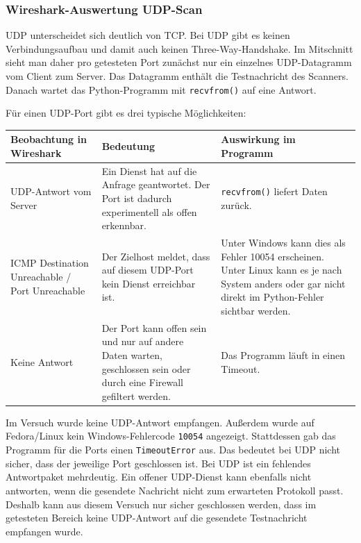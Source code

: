 \documentclass{kdiartcl}
\begin{document}
\subsubsection{Wireshark-Auswertung UDP-Scan}

UDP unterscheidet sich deutlich von TCP. Bei UDP gibt es keinen Verbindungsaufbau und damit auch keinen Three-Way-Handshake. Im Mitschnitt sieht man daher pro getesteten Port zunächst nur ein einzelnes UDP-Datagramm vom Client zum Server. Das Datagramm enthält die Testnachricht des Scanners. Danach wartet das Python-Programm mit \texttt{recvfrom()} auf eine Antwort.

Für einen UDP-Port gibt es drei typische Möglichkeiten:

\begin{center}
\small
\begin{tabularx}{\textwidth}{|l|Y|Y|}
\hline
\textbf{Beobachtung in Wireshark} & \textbf{Bedeutung} & \textbf{Auswirkung im Programm} \\
\hline
UDP-Antwort vom Server & Ein Dienst hat auf die Anfrage geantwortet. Der Port ist dadurch experimentell als offen erkennbar. & \texttt{recvfrom()} liefert Daten zurück. \\
\hline
ICMP Destination Unreachable / Port Unreachable & Der Zielhost meldet, dass auf diesem UDP-Port kein Dienst erreichbar ist. & Unter Windows kann dies als Fehler 10054 erscheinen. Unter Linux kann es je nach System anders oder gar nicht direkt im Python-Fehler sichtbar werden. \\
\hline
Keine Antwort & Der Port kann offen sein und nur auf andere Daten warten, geschlossen sein oder durch eine Firewall gefiltert werden. & Das Programm läuft in einen Timeout. \\
\hline
\end{tabularx}
\end{center}

Im Versuch wurde keine UDP-Antwort empfangen. Außerdem wurde auf Fedora/Linux kein Windows-Fehlercode \texttt{10054} angezeigt. Stattdessen gab das Programm für die Ports einen \texttt{TimeoutError} aus. Das bedeutet bei UDP nicht sicher, dass der jeweilige Port geschlossen ist. Bei UDP ist ein fehlendes Antwortpaket mehrdeutig. Ein offener UDP-Dienst kann ebenfalls nicht antworten, wenn die gesendete Nachricht nicht zum erwarteten Protokoll passt. Deshalb kann aus diesem Versuch nur sicher geschlossen werden, dass im getesteten Bereich keine UDP-Antwort auf die gesendete Testnachricht empfangen wurde.
\end{document}
